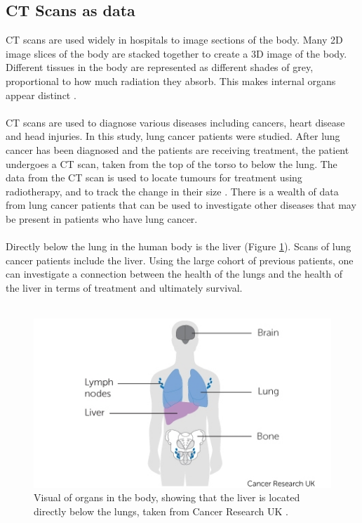 \documentclass[12pt]{article}
\begin{document}
\subsection{CT Scans as data}
CT scans are used widely in hospitals to image sections of the body. Many 2D image slices of the body are stacked together to create a 3D image of the body. Different tissues in the body are represented as different shades of grey, proportional to how much radiation they absorb. This makes internal organs appear distinct \cite{Broder:2011aa}.  
\\ \\
CT scans are used to diagnose various diseases including cancers, heart disease and head injuries. In this study, lung cancer patients were studied. After lung cancer has been diagnosed and the patients are receiving treatment, the patient undergoes a CT scan, taken from the top of the torso to below the lung. The data from the CT scan is used to locate tumours for treatment using radiotherapy, and to track the change in their size \cite{Purandare:2015aa}. There is a wealth of data from lung cancer patients that can be used to investigate other diseases that may be present in patients who have lung cancer. %
\\ \\
Directly below the lung in the human body is the liver (Figure \ref{lung_and_liver}). Scans of lung cancer patients include the liver. Using the large cohort of previous patients, one can investigate a connection between the health of the lungs and the health of the liver in terms of treatment and ultimately survival.
\\ \\
\begin{figure}[htp]
    \centering
    \includegraphics[width=\textwidth]{graphics/lung_and_liver}
    \caption{Visual of organs in the body, showing that the liver is located directly below the lungs, taken from Cancer Research UK \cite{body_diagram}.}
    \label{lung_and_liver}
\end{figure}
\end{document}
